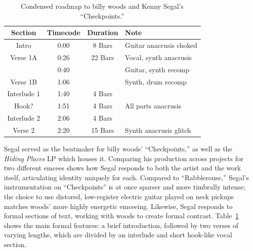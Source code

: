 \begin{table}[ht]
    \centering
    \begin{tabular}{|c|c|c|l|}
        \hline
         Section      & Timecode & Duration & Note                          \\ \hline
         Intro        & 0:00     & 8 Bars   & Guitar anacrusis choked       \\ \hline
         Verse 1A     & 0:26     & 22 Bars  & Vocal, synth  anacrusis       \\ \hline
                      & 0:40     &          & Guitar, synth recomp          \\ \hline
         Verse 1B     & 1:06     &          & Synth, drum recomp            \\ \hline
         Interlude 1  & 1:40     & 4 Bars   &                               \\ \hline
         Hook?        & 1:51     & 4 Bars   & All parts anacrusis           \\ \hline
         Interlude 2  & 2:06     & 4 Bars   &                               \\ \hline
         Verse 2      & 2:20     & 15 Bars  & Synth anacrusis glitch        \\ \hline
         
    \end{tabular}
    \caption{Condensed roadmap to billy woods and Kenny Segal's ``Checkpoints.''}
    \label{tab:checkpoints}
\end{table}

Segal served as the beatmaker for billy woods' ``Checkpoints,'' as well as the \textit{Hiding Places}
LP which houses it. Comparing his production across projects for two different emcees shows how Segal
responds to both the artist and the work itself, articulating identity uniquely for each. Compared to
``Rabblerouse,'' Segal's instrumentation on ``Checkpoints'' is at once sparser and more timbrally intense;
the choice to use distored, low-register electric guitar played on neck pickups matches woods' more highly
energetic emceeing. Likewise, Segal responds to formal sections of text, working with woods to create
formal contrast. Table~\ref{tab:checkpoints} shows the main formal features: a brief introduction,
followed by two verses of varying lengths, which are divided by an interlude and short hook-like
vocal section.

